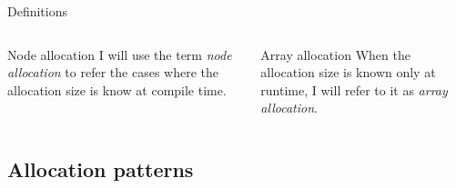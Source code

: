 \documentclass[10pt,aspectratio=169]{beamer}
\begin{document}
\begin{frame}[fragile]{Definitions}
\begin{columns}
\begin{column}{0.45\textwidth}

\begin{block} {Node allocation}
I will use the term {\it node allocation} to refer the cases
where the allocation size is know at compile time.
\end{block}

\end{column}

\begin{column}{0.45\textwidth}
\begin{block} {Array allocation}
When the allocation size is known only at runtime, I will refer to it
as {\it array allocation}.
\end{block}
\end{column}
\end{columns}
\end{frame}

\subsection{Allocation patterns}
\end{document}
